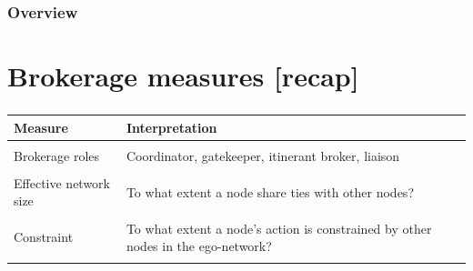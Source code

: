 \documentclass[8pt]{beamer}
\begin{document}
\begin{frame}
\frametitle{Overview}
\tableofcontents[hideallsubsections]
\end{frame}



\section{Brokerage measures [recap]}

\bgroup
{}
\begin{frame}[plain]{}
\begin{center}
\color{white}{\Huge\insertsection}
\end{center}
\end{frame}
\egroup


\begin{frame}
\frametitle{\insertsection}

\small
\begin{table}
\begin{tabular}{p{3cm}p{7.5cm}}
\toprule
\textbf{Measure}        & \textbf{Interpretation} \\
\hline
\\
Brokerage roles         & Coordinator, gatekeeper, itinerant broker, liaison\\
\\
Effective network size  & To what extent a node share ties with other nodes?\\
\\
Constraint              & To what extent a node's action is constrained by other nodes in the ego-network?\\
\\
\bottomrule
\end{tabular}
\end{table}
\end{frame}




\end{document}
